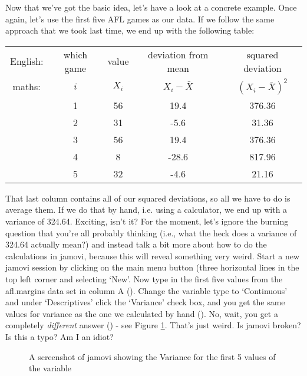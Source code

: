 Now that we've got the basic idea, let's have a look at a concrete example. Once again, let's use the first five AFL games as our data. If we follow the same approach that we took last time, we end up with the following table:

\vspace{0.5cm}
\begin{center}
\begin{tabular}{ccccc} 
English: & which game & value & deviation from mean & squared deviation \\
maths: & $i$ & $X_i$ & $X_i - \bar{X}$ &  $(X_i - \bar{X})^2$ \\ \hline
& 1 & 56 & 19.4  & 376.36\\
& 2 & 31 &  -5.6 & 31.36\\ 
& 3 & 56 & 19.4  & 376.36\\
& 4 & 8 & -28.6  & 817.96\\
& 5 & 32 & -4.6  & 21.16 \\
\end{tabular}
\end{center}

That last column contains all of our squared deviations, so all we have to do is average them. If we do that by hand, i.e. using a calculator, we end up with a variance of 324.64. Exciting, isn't it? For the moment, let's ignore the burning question that you're all probably thinking (i.e., what the heck does a variance of 324.64 actually mean?) and instead talk a bit more about how to do the calculations in jamovi, because this will reveal something very weird. Start a new jamovi session by clicking on the main menu button (three horizontal lines in the top left corner and selecting `New'. Now type in the first five values from the afl.margins data set in column A (). Change the variable type to `Continuous' and under `Descriptives' click the `Variance' check box, and you get the same values for variance as the one we calculated by hand (). No, wait, you get a completely {\it different} answer () - see Figure \ref{fig:aflsmall_margins_variance1}. That's just weird. Is jamovi broken? Is this a typo? Am I an idiot? 

\begin{figure}[ht]
\begin{center}
\caption{A screenshot of jamovi showing the Variance for the first 5 values of the  variable }
\label{fig:aflsmall_margins_variance1}
\HR
\end{center}
\end{figure}

